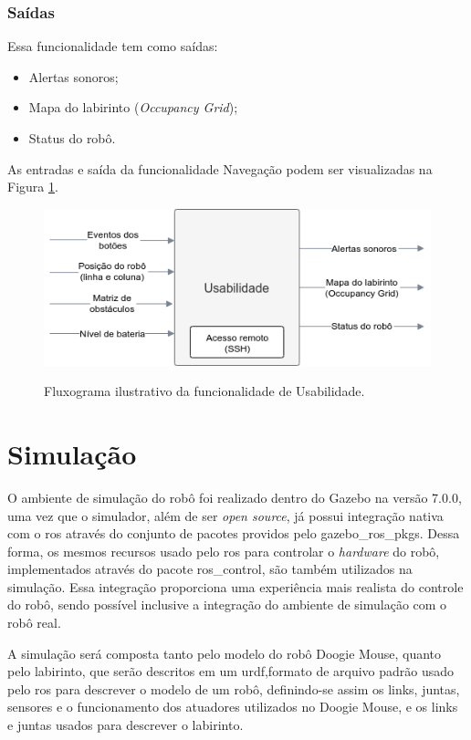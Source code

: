 \subsubsection{Saídas}
Essa funcionalidade tem como saídas:
\begin{itemize}
	\item Alertas sonoros;
	\item Mapa do labirinto (\textit{Occupancy Grid});
	\item Status do robô.
\end{itemize}

As entradas e saída da funcionalidade Navegação podem ser visualizadas na Figura \ref{fig:especificacao_funcional_usabilidade}.

\begin{figure}[H]
	\centering
	\caption{Fluxograma ilustrativo da funcionalidade de Usabilidade.}
	\includegraphics[width=1\textwidth]
	{Figures/especificacao_funcional_usabilidade}
	\label{fig:especificacao_funcional_usabilidade}
\end{figure}

\section{Simulação}
\label{sec:Simulacao}
O ambiente de simulação do robô foi realizado dentro do Gazebo \cite{Koenig2004} na versão 7.0.0, uma vez que o simulador, além de ser \textit{open source}, já possui integração nativa com o \gls*{ros} através do conjunto de pacotes providos pelo gazebo\_ros\_pkgs. Dessa forma, os mesmos recursos usado pelo \gls*{ros} para controlar o \textit{hardware} do robô, implementados através do pacote ros\_control, são também utilizados na simulação. Essa integração proporciona uma experiência mais realista do controle do robô, sendo possível inclusive a integração do ambiente de simulação com o robô real. 

A simulação será composta tanto pelo modelo do robô Doogie Mouse, quanto pelo labirinto, que serão descritos em um \gls*{urdf},formato de arquivo padrão usado pelo \gls*{ros} para descrever o modelo de um robô, definindo-se assim os links, juntas, sensores e o funcionamento dos atuadores utilizados no Doogie Mouse, e os links e juntas usados para descrever o labirinto.

